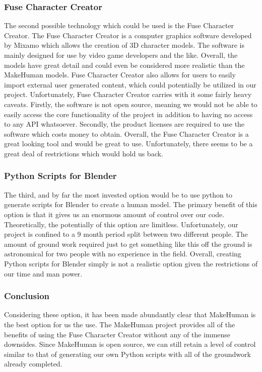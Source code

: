 \documentclass[letterpaper,10pt, onecolumn, draftclsnofoot]{IEEEtran}
\begin{document}
\subsubsection{Fuse Character Creator}

The second possible technology which could be used is the Fuse Character Creator. The Fuse Character Creator is a computer graphics software developed by Mixamo which allows the creation of 3D character models. The software is mainly designed for use by video game developers and the like. Overall, the models have great detail and could even be considered more realistic than the MakeHuman models. Fuse Character Creator also allows for users to easily import external user generated content, which could potentially be utilized in our project. Unfortunately, Fuse Character Creator carries with it some fairly heavy caveats. Firstly, the software is not open source, meaning we would not be able to easily access the core functionality of the project in addition to having no access to any API whatsoever. Secondly, the product licenses are required to use the software which costs money to obtain. Overall, the Fuse Character Creator is a great looking tool and would be great to use. Unfortunately, there seems to be a great deal of restrictions which would hold us back.

\subsubsection{Python Scripts for Blender}
The third, and by far the most invested option would be to use python to generate scripts for Blender to create a human model. The primary benefit of this option is that it gives us an enormous amount of control over our code. Theoretically, the potentially of this option are limitless. Unfortunately, our project is confined to a 9 month period split between two different people. The amount of ground work required just to get something like this off the ground is astronomical for two people with no experience in the field. Overall, creating Python scripts for Blender simply is not a realistic option given the restrictions of our time and man power.

\subsubsection{Conclusion}
Considering these option, it has been made abundantly clear that MakeHuman is the best option for us the use. The MakeHuman project provides all of the benefits of using the Fuse Character Creator without any of the immense downsides. Since MakeHuman is open source, we can still retain a level of control similar to that of generating our own Python scripts with all of the groundwork already completed.
\end{document}
